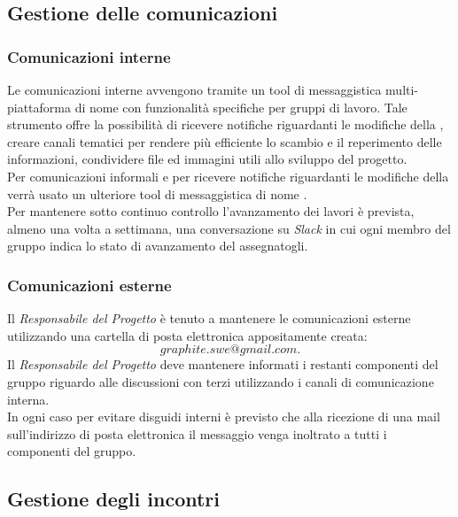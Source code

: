 \documentclass[../NormediProgetto.tex]{subfiles}
\begin{document}
	\subsection{Gestione delle comunicazioni}
	
	\subsubsection{Comunicazioni interne}
	
	Le comunicazioni interne avvengono tramite un tool di messaggistica multi-piattaforma di nome  con funzionalità specifiche per gruppi di lavoro. Tale strumento offre la possibilità di ricevere notifiche riguardanti le modifiche della  , creare canali tematici per rendere più efficiente lo scambio e il reperimento delle informazioni, condividere file ed immagini utili allo sviluppo del progetto.
	\\ \noindent Per comunicazioni informali e per ricevere notifiche riguardanti le modifiche della   verrà usato un ulteriore tool di messaggistica di nome .
	\\ \noindent Per mantenere sotto continuo controllo l'avanzamento dei lavori è prevista, almeno una volta a settimana, una conversazione su \textit{Slack} in cui ogni membro del gruppo indica lo stato di avanzamento del  assegnatogli.
	
	\subsubsection{Comunicazioni esterne}
	
	Il \textit{Responsabile del Progetto} è tenuto a mantenere le comunicazioni esterne utilizzando una cartella di posta elettronica appositamente creata:
	\[graphite.swe@gmail.com.\]
	Il \textit{Responsabile del Progetto} deve mantenere informati i restanti componenti del gruppo riguardo alle discussioni con terzi utilizzando i canali di comunicazione interna. 
	\\ \noindent In ogni caso per evitare disguidi interni è previsto che alla ricezione di una mail sull'indirizzo di posta elettronica il messaggio venga inoltrato a tutti i componenti del gruppo.
	
	\subsection{Gestione degli incontri}
	
\end{document}
